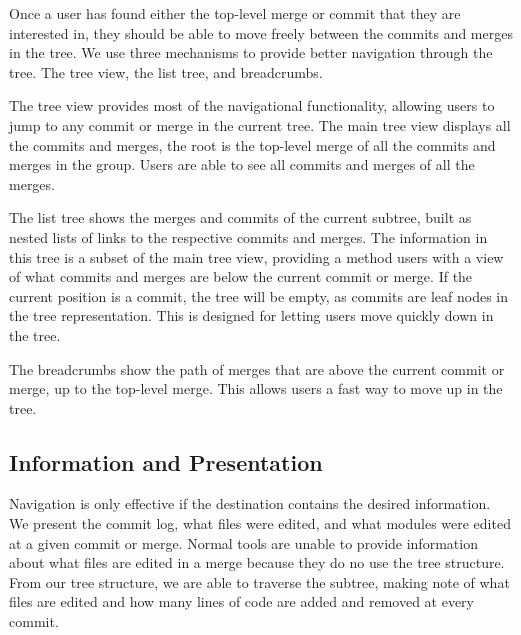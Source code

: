 \documentclass[conference, draftclsnofoot]{IEEEtran}
\begin{document}
Once a user has found either the top-level merge or commit that they are
interested in, they should be able to move freely between the commits and
merges in the tree. We use three mechanisms to provide better navigation
through the tree. The tree view, the list tree, and breadcrumbs.

The tree view provides most of the
navigational functionality, allowing users to jump to any commit or merge in
the current tree. The main tree view displays all the commits and merges, the
root is the top-level merge of all the commits and merges in the group. Users
are able to see all commits and merges of all the merges.


The list tree shows the merges and commits of the current subtree, built as
nested lists of links to the respective commits and merges. The information in
this tree is a subset of the main tree view, providing a method users with a
view of what commits and merges are below the current commit or merge. If the
current position is a commit, the tree will be empty, as commits are leaf
nodes in the tree representation. This is designed for letting users move
quickly down in the tree.



The breadcrumbs show the path of merges that are above the current commit or
merge, up to the top-level merge. This allows users a fast way to move up in
the tree.



\subsection{Information and Presentation}

Navigation is only effective if the destination contains the desired
information. We present the commit log, what files were edited, and what
modules were edited at a given commit or merge. Normal tools are unable to
provide information about what files are edited in a merge because they do no
use the tree structure. From our tree structure, we are able to traverse the
subtree, making note of what files are edited and how many lines of code are
added and removed at every commit.
\end{document}
